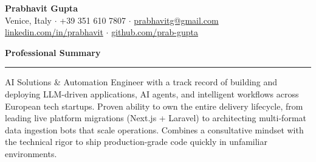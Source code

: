 \documentclass[10pt,a4paper]{article}
\begin{document}
\noindent\textbf{\LARGE Prabhavit Gupta} \\
Venice, Italy $\cdot$ +39 351 610 7807 $\cdot$ \href{mailto:prabhavitg@gmail.com}{prabhavitg@gmail.com} \\
\href{https://www.linkedin.com/in/prabhavit/}{linkedin.com/in/prabhavit} $\cdot$ \href{https://github.com/prab-gupta}{github.com/prab-gupta}

\vspace{1em}
\noindent\textbf{\large Professional Summary}
\vspace{0.5em}
\hrule
\vspace{0.5em}
AI Solutions \& Automation Engineer with a track record of building and deploying LLM-driven applications, AI agents, and intelligent workflows across European tech startups. Proven ability to own the entire delivery lifecycle, from leading live platform migrations (Next.js + Laravel) to architecting multi-format data ingestion bots that scale operations. Combines a consultative mindset with the technical rigor to ship production-grade code quickly in unfamiliar environments.
\end{document}
